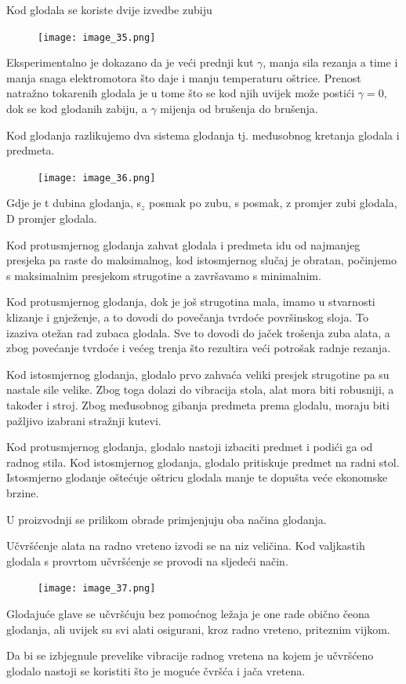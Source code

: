 \documentclass[a4paper,12pt]{article}
\numberwithin{figure}{section}
\begin{document}
\clearpage
Kod glodala se koriste dvije izvedbe zubiju
\begin{figure}[!h]
\centering
\texttt{[image: image\_35.png]}
\end{figure}
\FloatBarrier
Eksperimentalno je dokazano da je veći prednji kut $\gamma$, manja sila rezanja a time i manja snaga elektromotora što daje i manju temperaturu oštrice. Prenost natražno tokarenih glodala je u tome što se kod njih uvijek može postići $\gamma = 0$, dok se kod glodanih zabiju, a $\gamma$ mijenja od brušenja do brušenja.\par
Kod glodanja razlikujemo dva sistema glodanja tj. međusobnog kretanja glodala i predmeta.
\begin{figure}[!h]
\centering
\texttt{[image: image\_36.png]}
\end{figure}
\FloatBarrier
Gdje je t dubina glodanja, s$_{z}$ posmak po zubu, s posmak, z promjer zubi glodala, D promjer glodala. \par
Kod protusmjernog glodanja zahvat glodala i predmeta idu od najmanjeg presjeka pa raste do maksimalnog, kod istosmjernog slučaj je obratan, počinjemo s maksimalnim presjekom strugotine a završavamo s minimalnim.\par
Kod  protusmjernog glodanja, dok je još strugotina mala, imamo u stvarnosti klizanje i gnježenje, a to dovodi do povečanja tvrdoće površinskog sloja. To izaziva otežan rad zubaca glodala. Sve to dovodi do jaček trošenja zuba alata, a zbog povećanje tvrdoće i većeg trenja što rezultira veći potrošak radnje rezanja.\par
Kod istosmjernog glodanja, glodalo prvo zahvaća veliki presjek strugotine pa su nastale sile velike. Zbog toga
dolazi do vibracija stola, alat mora biti robusniji, a također i stroj. Zbog međusobnog gibanja predmeta prema glodalu, moraju biti pažljivo izabrani stražnji kutevi. \par
Kod protusmjernog glodanja, glodalo nastoji izbaciti predmet i podići ga od radnog stila. Kod istosmjernog glodanja, glodalo pritiskuje predmet na radni stol. Istosmjerno glodanje oštećuje oštricu glodala manje te dopušta veće ekonomske brzine.\par
U proizvodnji se prilikom obrade primjenjuju oba načina glodanja.\par
Učvršćenje alata na radno vreteno izvodi se na niz veličina. Kod valjkastih glodala s provrtom učvršćenje se provodi na sljedeći način.
\begin{figure}[!h]
\centering
\texttt{[image: image\_37.png]}
\end{figure}
\FloatBarrier
Glodajuće glave se učvršćuju bez pomoćnog ležaja je one rade obično čeona glodanja, ali uvijek su svi alati osigurani, kroz radno vreteno, priteznim vijkom.\par
Da bi se izbjegnule prevelike vibracije radnog vretena na kojem je učvršćeno glodalo nastoji se koristiti što je moguće čvršća i jača vretena.
\end{document}
